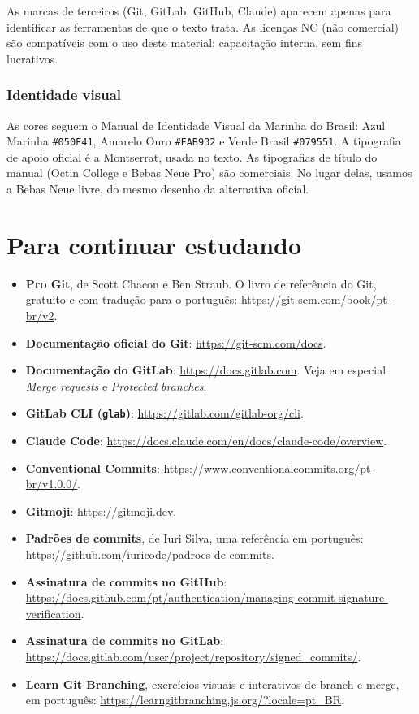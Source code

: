 As marcas de terceiros (Git, GitLab, GitHub, Claude) aparecem apenas para identificar as ferramentas de que o texto trata. As licenças NC (não comercial) são compatíveis com o uso deste material: capacitação interna, sem fins lucrativos.

\subsection*{Identidade visual}

As cores seguem o Manual de Identidade Visual da Marinha do Brasil: Azul Marinha \texttt{\#050F41}, Amarelo Ouro \texttt{\#FAB932} e Verde Brasil \texttt{\#079551}. A tipografia de apoio oficial é a Montserrat, usada no texto. As tipografias de título do manual (Octin College e Bebas Neue Pro) são comerciais. No lugar delas, usamos a Bebas Neue livre, do mesmo desenho da alternativa oficial.

\chapter{Para continuar estudando}
\label{ap:referencias}

\begin{itemize}
  \item \textbf{Pro Git}, de Scott Chacon e Ben Straub. O livro de referência do Git, gratuito e com tradução para o português: \url{https://git-scm.com/book/pt-br/v2}.
  \item \textbf{Documentação oficial do Git}: \url{https://git-scm.com/docs}.
  \item \textbf{Documentação do GitLab}: \url{https://docs.gitlab.com}. Veja em especial \emph{Merge requests} e \emph{Protected branches}.
  \item \textbf{GitLab CLI (\texttt{glab})}: \url{https://gitlab.com/gitlab-org/cli}.
  \item \textbf{Claude Code}: \url{https://docs.claude.com/en/docs/claude-code/overview}.
  \item \textbf{Conventional Commits}: \url{https://www.conventionalcommits.org/pt-br/v1.0.0/}.
  \item \textbf{Gitmoji}: \url{https://gitmoji.dev}.
  \item \textbf{Padrões de commits}, de Iuri Silva, uma referência em português: \url{https://github.com/iuricode/padroes-de-commits}.
  \item \textbf{Assinatura de commits no GitHub}: \url{https://docs.github.com/pt/authentication/managing-commit-signature-verification}.
  \item \textbf{Assinatura de commits no GitLab}: \url{https://docs.gitlab.com/user/project/repository/signed_commits/}.
  \item \textbf{Learn Git Branching}, exercícios visuais e interativos de branch e merge, em português: \url{https://learngitbranching.js.org/?locale=pt_BR}.
\end{itemize}

